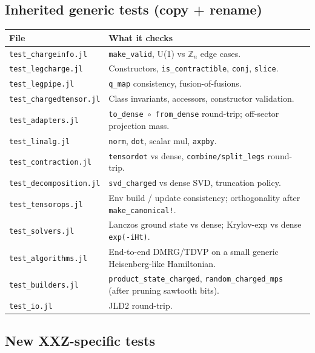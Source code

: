 \documentclass[11pt]{article}
\begin{document}
\subsection{Inherited generic tests (copy + rename)}
\begin{center}
\begin{tabularx}{\linewidth}{l X}
\toprule
File & What it checks \\
\midrule
\texttt{test\_chargeinfo.jl}    & \texttt{make\_valid}, U(1) vs $\mathbb{Z}_n$ edge cases. \\
\texttt{test\_legcharge.jl}     & Constructors, \texttt{is\_contractible}, \texttt{conj}, \texttt{slice}. \\
\texttt{test\_legpipe.jl}       & \texttt{q\_map} consistency, fusion-of-fusions. \\
\texttt{test\_chargedtensor.jl} & Class invariants, accessors, constructor validation. \\
\texttt{test\_adapters.jl}      & \texttt{to\_dense $\circ$ from\_dense} round-trip; off-sector projection mass. \\
\texttt{test\_linalg.jl}        & \texttt{norm}, \texttt{dot}, scalar mul, \texttt{axpby}. \\
\texttt{test\_contraction.jl}   & \texttt{tensordot} vs dense, \texttt{combine/split\_legs} round-trip. \\
\texttt{test\_decomposition.jl} & \texttt{svd\_charged} vs dense SVD, truncation policy. \\
\texttt{test\_tensorops.jl}     & Env build / update consistency; orthogonality after \texttt{make\_canonical!}. \\
\texttt{test\_solvers.jl}       & Lanczos ground state vs dense; Krylov-exp vs dense \texttt{exp(-iHt)}. \\
\texttt{test\_algorithms.jl}    & End-to-end DMRG/TDVP on a small generic Heisenberg-like Hamiltonian. \\
\texttt{test\_builders.jl}      & \texttt{product\_state\_charged}, \texttt{random\_charged\_mps} (after pruning sawtooth bits). \\
\texttt{test\_io.jl}            & JLD2 round-trip. \\
\bottomrule
\end{tabularx}
\end{center}

\subsection{New XXZ-specific tests}
\end{document}
